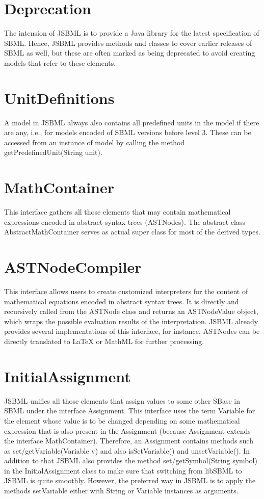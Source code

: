 \section{Deprecation}

The intension of JSBML is to provide a Java library for the latest 
specification of SBML. Hence, JSBML provides methods and classes to
cover earlier releases of SBML as well, but these are often marked
as being deprecated to avoid creating models that refer to these 
elements.

\section{UnitDefinitions}

A model in JSBML always also contains all predefined units in the model
if there are any, i.e., for models encoded of SBML versions before level
3. These can be accessed from an instance of model by calling the method
getPredefinedUnit(String unit).

\section{MathContainer}

This interface gathers all those elements that may contain mathematical
expressions encoded in abstract syntax trees (ASTNodes). The abstract
class AbstractMathContainer serves as actual super class for most of
the derived types.

\section{ASTNodeCompiler}

This interface allows users to create customized interpreters for the
content of mathematical equations encoded in abstract syntax trees. It
is directly and recursively called from the ASTNode class and returns
an ASTNodeValue object, which wraps the possible evaluation results of
the interpretation. JSBML already provides several implementations of
this interface, for instance, ASTNodes can be directly translated to
LaTeX or MathML for further processing. 

\section{InitialAssignment}

JSBML unifies all those elements that assign values to some other 
SBase in SBML under the interface Assignment. This interface uses
the term Variable for the element whose value is to be changed depending
on some mathematical expression that is also present in the Assignment
(because Assignment extends the interface MathContainer). Therefore,
an Assignment contains methods such as set/getVariable(Variable v)
and also isSetVariable() and unsetVariable(). In addition to that
JSBML also provides the method set/getSymbol(String symbol) in the
InitialAssignment class to make sure that switching from libSBML to
JSBML is quite smoothly. However, the preferred way in JSBML is to
apply the methods setVariable either with String or Variable instances
as arguments.
 

